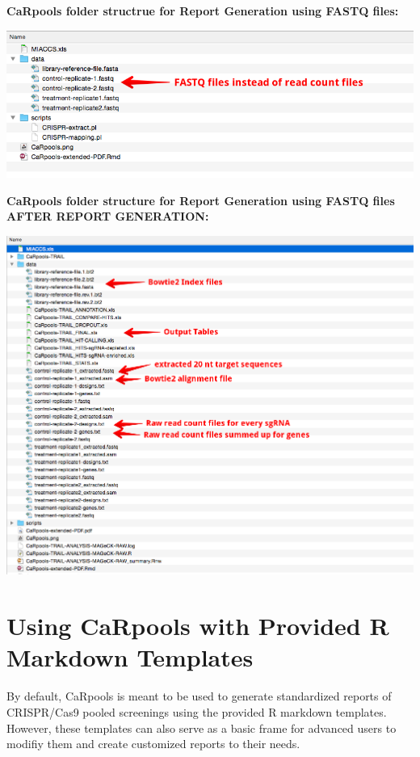 \documentclass[]{article}
\begin{document}
\newpage

\textbf{CaRpools folder structrue for Report Generation using FASTQ
files:}

\includegraphics{./pictures/folder-structure-FASTQ-before.png}

\newpage

\textbf{CaRpools folder structure for Report Generation using FASTQ
files AFTER REPORT GENERATION:}

\includegraphics{./pictures/folder-structure-FASTQ-FINAL.png}

\newpage

\section{Using CaRpools with Provided R Markdown
Templates}\label{using-carpools-with-provided-r-markdown-templates}

By default, CaRpools is meant to be used to generate standardized
reports of CRISPR/Cas9 pooled screenings using the provided R markdown
templates.\\
However, these templates can also serve as a basic frame for advanced
users to modifiy them and create customized reports to their needs.
\end{document}
